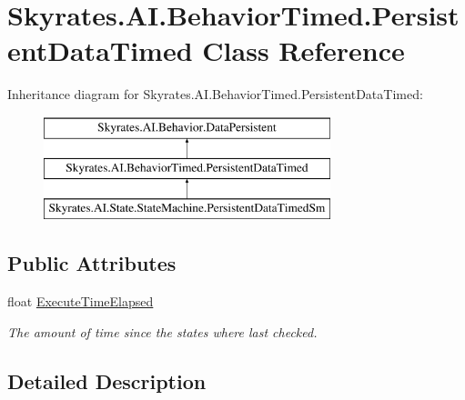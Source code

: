 \hypertarget{class_skyrates_1_1_a_i_1_1_behavior_timed_1_1_persistent_data_timed}{\section{Skyrates.\-A\-I.\-Behavior\-Timed.\-Persistent\-Data\-Timed Class Reference}
\label{class_skyrates_1_1_a_i_1_1_behavior_timed_1_1_persistent_data_timed}
}


 


Inheritance diagram for Skyrates.\-A\-I.\-Behavior\-Timed.\-Persistent\-Data\-Timed\-:\begin{figure}[H]
\begin{center}
\leavevmode
\includegraphics[height=3.000000cm]{class_skyrates_1_1_a_i_1_1_behavior_timed_1_1_persistent_data_timed}
\end{center}
\end{figure}
\subsection*{Public Attributes}
\begin{DoxyCompactItemize}
\item 
float \hyperlink{class_skyrates_1_1_a_i_1_1_behavior_timed_1_1_persistent_data_timed_a5bace690d7d24e32ac9c47f0ff8e2f2c}{Execute\-Time\-Elapsed}
\begin{DoxyCompactList}\small\item\em The amount of time since the states where last checked. \end{DoxyCompactList}\end{DoxyCompactItemize}


\subsection{Detailed Description}


